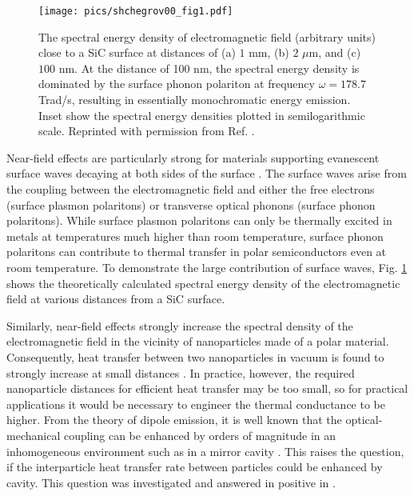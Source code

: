 \begin{figure}
\begin{center}
 \texttt{[image: pics/shchegrov00\_fig1.pdf]}
 \caption{The spectral energy density of electromagnetic field (arbitrary units) close to a SiC surface at distances of (a) $1$ mm, (b) $2$ $\mu$m, and (c) $100$ nm. At the distance of 100 nm, the spectral energy density is dominated by the surface phonon polariton at frequency $\omega=178.7$ Trad/s, resulting in essentially monochromatic energy emission. Inset show the spectral energy densities plotted in semilogarithmic scale. Reprinted with permission from Ref. \cite{shchegrov00}.}
\label{fig:intro_shchegrov}
\end{center}
\end{figure} 

Near-field effects are particularly strong for materials supporting evanescent surface waves decaying at both sides of the surface \cite{shchegrov00}. The surface waves arise from the coupling between the electromagnetic field and either the free electrons (surface plasmon polaritons) or transverse optical phonons (surface phonon polaritons). While surface plasmon polaritons can only be thermally excited in metals at temperatures much higher than room temperature, surface phonon polaritons can contribute to thermal transfer in polar semiconductors even at room temperature. To demonstrate the large contribution of surface waves, Fig. \ref{fig:intro_shchegrov} shows the theoretically calculated \cite{shchegrov00} spectral energy density of the electromagnetic field at various distances from a SiC surface.

Similarly, near-field effects strongly increase the spectral density of the electromagnetic field in the vicinity of nanoparticles made of a polar material. Consequently, heat transfer between two nanoparticles in vacuum is found to strongly increase at small distances \cite{domingues05}. In practice, however, the required nanoparticle distances for efficient heat transfer may be too small, so for practical applications it would be necessary to engineer the thermal conductance to be higher. From the theory of dipole emission, it is well known that the optical-mechanical coupling can be enhanced by orders of magnitude in an inhomogeneous environment such as in a mirror cavity \cite{novotny}. This raises the question, if the interparticle heat transfer rate between particles could be enhanced by cavity. This question was investigated and answered in positive in .

